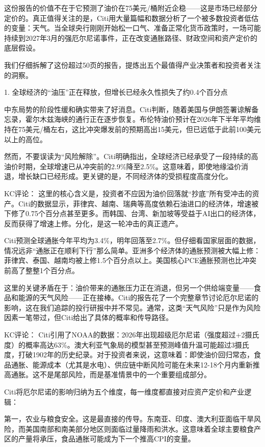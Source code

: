 \documentclass[11pt]{ctexart}
\begin{document}
这份报告的价值不在于它预测了油价在75美元/桶附近企稳——这是市场已经部分定价的。真正值得关注的是，Citi用大量篇幅和数据分析了一个被多数投资者低估的变量：天气。当全球央行刚刚开始松一口气、准备正常化货币政策时，一场可能持续到2027年3月的强厄尔尼诺事件，正在改变通胀路径、财政空间和资产定价的底层假设。

我们仔细拆解了这份超过50页的报告，提炼出五个最值得产业决策者和投资者关注的洞察。

1. 全球经济的“油压”正在释放，但增长已经永久性损失了约0.4个百分点

中东局势的阶段性缓和确实带来了好消息。Citi判断，随着美国与伊朗签署谅解备忘录，霍尔木兹海峡的通行正在逐步恢复。布伦特油价预计在2026年下半年平均维持在75美元/桶左右，这比冲突爆发前的预期高出15美元，但已远低于此前100美元以上的高位。

然而，不要误读为“风险解除”。Citi明确指出，全球经济已经承受了一段持续的高油价时期，全球增速已从冲突前的2.9\%降至2.5\%。这意味着，即使地缘溢价消退，增长缺口已经形成。更关键的是，不同经济体的受损程度高度分化。

KC评论： 这里的核心含义是，投资者不应因为油价回落就“抄底”所有受冲击的资产。Citi的数据显示，菲律宾、越南、瑞典等高度依赖石油进口的经济体，增速被下修了0.75个百分点甚至更多。而韩国、台湾、新加坡等受益于AI出口的经济体，反而获得了增速上修。分化，是这一轮冲击的真正遗产。

Citi预测全球通胀今年平均为3.4\%，明年回落至2.7\%。但仔细看国家层面的数据，情况远非“通胀正在顺利下行”那么简单。亚洲多个经济体的通胀预测被大幅上修：菲律宾、泰国、越南均被上修1.5个百分点以上。美国核心PCE通胀预测也比冲突前高了整整1个百分点。

这里的关键矛盾在于：油价带来的通胀压力正在消退，但另一个供给端变量——食品和能源的天气风险——正在接棒。Citi的报告花了一个完整章节讨论厄尔尼诺的影响，这在我们追踪的投行研报中并不常见。通常，这类“天气风险”只是作为风险因素一笔带过，但Citi给出了具体的概率和传导路径。

KC评论： Citi引用了NOAA的数据：2026年出现超级厄尔尼诺（强度超过+2摄氏度）的概率高达63\%。澳大利亚气象局的模型甚至预测峰值升温可能超过3摄氏度，打破1902年的历史纪录。对于投资者来说，这意味着：即使油价回归常态，食品通胀、能源成本（尤其是水电）、供应链中断风险可能在未来12-18个月内重新推高通胀。这不是尾部风险，而是基准情景中的一个重要组成部分。

Citi将厄尔尼诺的影响归纳为五个维度，每一维度都直接对应资产定价和产业逻辑：

第一，农业与粮食安全。这是最直接的传导。东南亚、印度、澳大利亚面临干旱风险，而美国南部和南美部分地区则面临过量降雨和洪水。这意味着全球主要粮食产区的产量将承压，食品通胀可能成为下一个推高CPI的变量。
\end{document}
